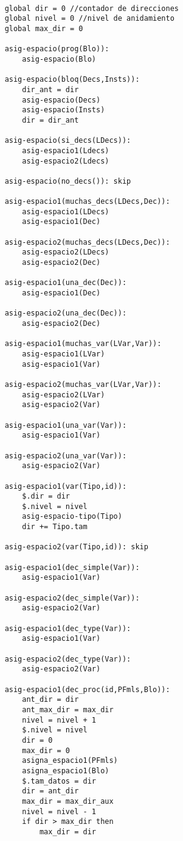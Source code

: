 \begin{lstlisting}

    global dir = 0 //contador de direcciones
    global nivel = 0 //nivel de anidamiento
    global max_dir = 0
    
    asig-espacio(prog(Blo)):
        asig-espacio(Blo)

    asig-espacio(bloq(Decs,Insts)):
        dir_ant = dir
        asig-espacio(Decs)
        asig-espacio(Insts)
        dir = dir_ant
    
    asig-espacio(si_decs(LDecs)):
        asig-espacio1(Ldecs)
        asig-espacio2(Ldecs)
    
    asig-espacio(no_decs()): skip
    
    asig-espacio1(muchas_decs(LDecs,Dec)):
        asig-espacio1(LDecs)
        asig-espacio1(Dec)
    
    asig-espacio2(muchas_decs(LDecs,Dec)):
        asig-espacio2(LDecs)
        asig-espacio2(Dec)
    
    asig-espacio1(una_dec(Dec)):
        asig-espacio1(Dec)

    asig-espacio2(una_dec(Dec)):
        asig-espacio2(Dec)

    asig-espacio1(muchas_var(LVar,Var)):
        asig-espacio1(LVar)
        asig-espacio1(Var)
    
    asig-espacio2(muchas_var(LVar,Var)):
        asig-espacio2(LVar)
        asig-espacio2(Var)

    asig-espacio1(una_var(Var)):
        asig-espacio1(Var)

    asig-espacio2(una_var(Var)):
        asig-espacio2(Var)
    
    asig-espacio1(var(Tipo,id)):
        $.dir = dir
        $.nivel = nivel
        asig-espacio-tipo(Tipo)
        dir += Tipo.tam

    asig-espacio2(var(Tipo,id)): skip
    
    asig-espacio1(dec_simple(Var)):
        asig-espacio1(Var)

    asig-espacio2(dec_simple(Var)):
        asig-espacio2(Var)

    asig-espacio1(dec_type(Var)):
        asig-espacio1(Var)

    asig-espacio2(dec_type(Var)):
        asig-espacio2(Var)
    
    asig-espacio1(dec_proc(id,PFmls,Blo)):
        ant_dir = dir 
        ant_max_dir = max_dir
        nivel = nivel + 1
        $.nivel = nivel
        dir = 0 
        max_dir = 0
        asigna_espacio1(PFmls)
        asigna_espacio1(Blo)
        $.tam_datos = dir 
        dir = ant_dir 
        max_dir = max_dir_aux
        nivel = nivel - 1 
        if dir > max_dir then
            max_dir = dir


\end{lstlisting}

